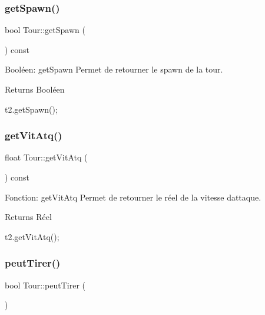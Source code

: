 \subsubsection{\texorpdfstring{get\+Spawn()}{getSpawn()}}
{\footnotesize\ttfamily bool Tour\+::get\+Spawn (\begin{DoxyParamCaption}{ }\end{DoxyParamCaption}) const}



Booléen\+: get\+Spawn Permet de retourner le spawn de la tour. 

\begin{DoxyReturn}{Returns}
Booléen 
\begin{DoxyCode}
t2.getSpawn();
\end{DoxyCode}
 
\end{DoxyReturn}
\mbox{\label{classTour_aa5bfbcd4783a1917adc670ff92283771}} 
\subsubsection{\texorpdfstring{get\+Vit\+Atq()}{getVitAtq()}}
{\footnotesize\ttfamily float Tour\+::get\+Vit\+Atq (\begin{DoxyParamCaption}{ }\end{DoxyParamCaption}) const}



Fonction\+: get\+Vit\+Atq Permet de retourner le réel de la vitesse d\textquotesingle{}attaque. 

\begin{DoxyReturn}{Returns}
Réel 
\begin{DoxyCode}
t2.getVitAtq();
\end{DoxyCode}
 
\end{DoxyReturn}
\mbox{\label{classTour_ab9f95f1a87befc1c47c5904c7dba213e}} 
\subsubsection{\texorpdfstring{peut\+Tirer()}{peutTirer()}}
{\footnotesize\ttfamily bool Tour\+::peut\+Tirer (\begin{DoxyParamCaption}{ }\end{DoxyParamCaption})}




